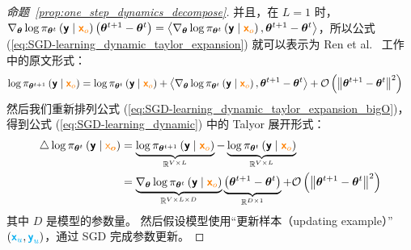 \documentclass[citestyle=gb7714-2015, bibstyle=gb7714-2015,lang=cn,14pt,scheme=chinese]{elegantbook}
\begin{document}
\begin{proof}[命题~\ref{prop:one_step_dynamics_decompose}]
并且，在 \(L=1\) 时， \(\nabla_{\bm{\theta}} \log \pi_{\bm{\theta}^{t}} \left( \bm{\mathsf{y}} \mid \textcolor{orange}{\bm{\mathsf{x}}_{o}} \right) \left( \bm{\theta}^{t+1} - \bm{\theta}^{t} \right) = \left\langle \nabla_{\bm{\theta}} \log \pi_{\bm{\theta}^{t}} \left( \bm{\mathsf{y}} \mid \textcolor{orange}{\bm{\mathsf{x}}_{o}} \right), \bm{\theta}^{t+1} - \bm{\theta}^{t} \right\rangle\)，所以公式 (\ref{eq:SGD-learning_dynamic_taylor_expansion}) 就可以表示为 Ren et al.~\cite{DBLP:conf/iclr/RenS25} 工作中的原文形式：
\begin{equation}\label{eq:SGD-learning_dynamic_taylor_expansion_bigO_vector}
\begin{aligned}
    \log \pi_{\bm{\theta}^{t+1}} \left( \bm{\mathsf{y}} \mid \textcolor{orange}{\bm{\mathsf{x}}_{o}} \right) &= \log \pi_{\bm{\theta}^{t}} \left( \bm{\mathsf{y}} \mid \textcolor{orange}{\bm{\mathsf{x}}_{o}} \right) + \left\langle \nabla_{\bm{\theta}} \log \pi_{\bm{\theta}^{t}} \left( \bm{\mathsf{y}} \mid \textcolor{orange}{\bm{\mathsf{x}}_{o}} \right), \bm{\theta}^{t+1} - \bm{\theta}^{t} \right\rangle + \mathcal{O} \left( \left\| \bm{\theta}^{t+1} - \bm{\theta}^{t} \right\|^{2} \right)
\end{aligned}
\end{equation}
然后我们重新排列公式 (\ref{eq:SGD-learning_dynamic_taylor_expansion_bigO})，得到公式 (\ref{eq:SGD-learning_dynamic}) 中的 Talyor 展开形式：
\[
\begin{aligned}
    \triangle \log \pi_{\bm{\theta}^{t}} \left( \bm{\mathsf{y}} \mid \textcolor{orange}{\bm{\textsf{x}_{o}}} \right) &= \underbrace{\log \pi_{\bm{\theta}^{t+1}} \left( \bm{\mathsf{y}} \mid \textcolor{orange}{\bm{\mathsf{x}}_{o}} \right)}_{\mathbb{R}^{V \times L}} - \underbrace{\log \pi_{\bm{\theta}^{t}} \left( \bm{\mathsf{y}} \mid \textcolor{orange}{\bm{\mathsf{x}}_{o}} \right)}_{\mathbb{R}^{V \times L}} \\
    &= \underbrace{\nabla_{\bm{\theta}} \log \pi_{\bm{\theta}^{t}} \left( \bm{\mathsf{y}} \mid \textcolor{orange}{\bm{\mathsf{x}}_{o}} \right)}_{\mathbb{R}^{V \times L \times D}} \underbrace{\left( \bm{\theta}^{t+1} - \bm{\theta}^{t} \right)}_{\mathbb{R}^{D \times 1}} + \mathcal{O} \left( \left\| \bm{\theta}^{t+1} - \bm{\theta}^{t} \right\|^{2} \right) \\
\end{aligned}
\]
其中 \(D\) 是模型的参数量。
然后假设模型使用“更新样本（updating example）” \(\left(\textcolor{cyan}{\bm{\mathsf{x}}_{u}}, \textcolor{cyan}{\bm{\mathsf{y}}_{u}}\right)\)，通过 SGD 完成参数更新。


\end{proof}
\end{document}
